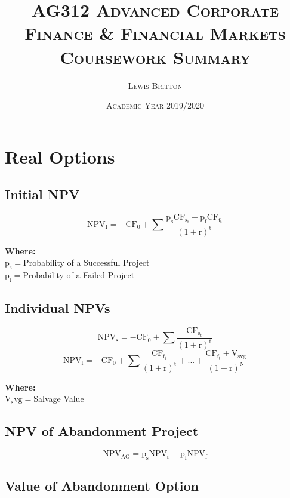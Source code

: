 \documentclass[11pt, english]{article}
\begin{document}

        \title{\textsc{AG312 Advanced Corporate Finance \& Financial Markets\\ Coursework Summary}}
        \author{\textsc{Lewis Britton}}
        \date{\textsc{Academic Year 2019/2020}}
        \maketitle

\newpage


        \renewcommand{\contentsname}{Table of Contents}

        \tableofcontents

\newpage


\section{Real Options}

	\subsection{Initial NPV}

	$$\mathrm{NPV_I=-CF_0+\sum\frac{p_sCF_{s_t}+p_fCF_{f_t}}{(1+r)^t}}$$

	\textbf{Where:}\\
	$\mathrm{p_s=}$Probability of a Successful Project\\
	$\mathrm{p_f=}$Probability of a Failed Project

	\subsection{Individual NPVs}

	$$\mathrm{NPV_s=-CF_0+\sum\frac{CF_{s_t}}{(1+r)^t}}$$
	$$\mathrm{NPV_f=-CF_0+\sum\frac{CF_{f_t}}{(1+r)^t}+...+\frac{CF_{f_t}+V_{svg}}{(1+r)^N}}$$

	\textbf{Where:}\\
	$\mathrm{V_svg=}$Salvage Value

	\subsection{NPV of Abandonment Project}
	
	$$\mathrm{NPV_{AO}=p_sNPV_s+p_fNPV_f}$$

	\subsection{Value of Abandonment Option}
\end{document}

